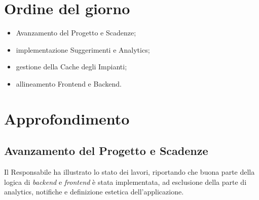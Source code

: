 \documentclass[10pt, letterpaper]{article}
\begin{document}
\makeTitlePage

\newpage

\tableofcontents

\newpage


\makeMeetingParticipantsTable

\section{Ordine del giorno}
\begin{itemize}
      \item Avanzamento del Progetto e Scadenze;
      \item implementazione Suggerimenti e Analytics;
      \item gestione della Cache degli Impianti;
      \item allineamento Frontend e Backend.
\end{itemize}

\section{Approfondimento}

\subsection*{Avanzamento del Progetto e Scadenze}
Il Responsabile ha illustrato lo stato dei lavori, riportando che buona parte della logica di \textit{backend} e \textit{frontend} è stata implementata, ad esclusione
della parte di analytics, notifiche e definizione estetica dell'applicazione. 
\end{document}
